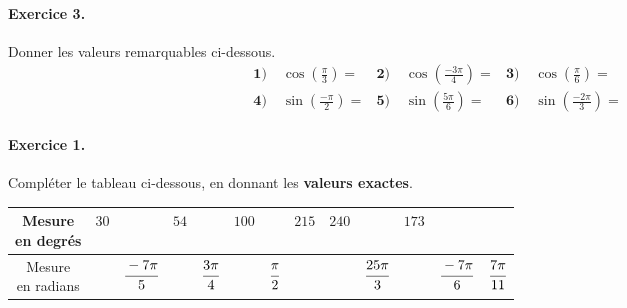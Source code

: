\documentclass[11pt]{article}
\begin{document}
\paragraph{Exercice 3.} Donner les valeurs remarquables ci-dessous.
\begin{align*}
  \textbf{1)}\; & \cos\left( \frac{\pi}{3} \right) = &
  \textbf{2)}\; & \cos\left( \frac{-3\pi}{4} \right) = &
  \textbf{3)}\; & \cos\left( \frac{\pi}{6} \right) = \\
  \textbf{4)}\; & \sin\left( \frac{-\pi}{2} \right) = &
  \textbf{5)}\; & \sin\left( \frac{5\pi}{6} \right) = &
  \textbf{6)}\; & \sin\left( \frac{-2\pi}{3} \right) =
\end{align*}

\vspace{1cm}

\paragraph{Exercice 1.}
Compléter le tableau ci-dessous, en donnant les \textbf{valeurs exactes}.
\def\arraystretch{2}
\begin{center}
\begin{tabular}{|c|c|c|c|c|c|c|c|c|c|c|c|c|}
  \hline
  \makecell{Mesure\\en degrés} & $30$ & & $54$ &  & $100$ & \phantom{$180$} &
  $215$ & $240$ & & $173$ & & \\
  \hline
  \makecell{Mesure\\en radians} & & $\cfrac{-7\pi}{5}$ & & $\cfrac{3\pi}{4}$ & &
  $\cfrac{\pi}{2}$ & & & $\cfrac{25\pi}{3}$ & & $\cfrac{-7\pi}{6}$ &
  $\cfrac{7\pi}{11}$\\
  \hline
\end{tabular}
\end{center}
\end{document}
